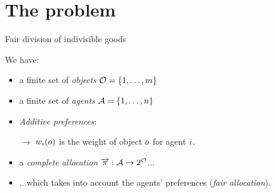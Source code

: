 \documentclass[9pt,english]{beamer}
\title{\centering{Governance and Organizational Sponsorship\\
                  as Success Factors in\\
                  Free/Libre and Open Source Software Development:\\
                  An Empirical Investigation\\
                  using Structural Equation Modeling\\
                  \parbox{0.7\textwidth}}}
\author{\centering{
  Aleksandr Blekh\\
  Nova Southeastern University\\
  Graduate School of Computer and Information Sciences\\
  \parbox{0.7\textwidth}}}
\date{\centering{
  Defence of a dissertation submitted in partial fulfillment of the requirements\\
  for the degree of Doctor of Philosophy in Information Systems\\
  Fort Lauderdale, FL, USA\\
  November 20, 2014\\}}
\begin{document}
\begin{frame}[plain]
  \titlepage
\end{frame}

\section{The problem}

\begin{frame}{Fair division of indivisible goods}
  \begin{overlayarea}{\textwidth}{0.5\textheight}
    We have:
    \begin{itemize}
    \item<2-> a finite set of \emph{objects} ${\mathcal{O}} = \{1,\dots,{m}\}$
    \item<3-> a finite set of \emph{agents} ${\mathcal{A}} =
      \{1,\dots,{n}\}$
    \item<4-> \emph{Additive preferences}: \parbox[t]{0.5\textwidth}{$\to$ $w_{i}(o)$ is the
      weight of object $o$ for agent $i$.}
    \end{itemize}
    
    \begin{itemize}
    \item<7-> a \emph{complete allocation} $\overrightarrow{\pi}: {\mathcal{A}} \to
      2^{{\mathcal{O}}}$...
    \item<8-> ...which takes into account the agents' preferences
      (\emph{fair allocation}).
    \end{itemize}

  \end{overlayarea}
  
  \vfill


\end{frame}
\end{document}
